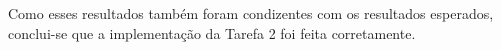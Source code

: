 \documentclass[conference]{IEEEtran}
\begin{document}
	Como esses resultados também foram condizentes com os resultados esperados, conclui-se que a implementação da Tarefa 2 foi feita corretamente.
	



\end{document}
